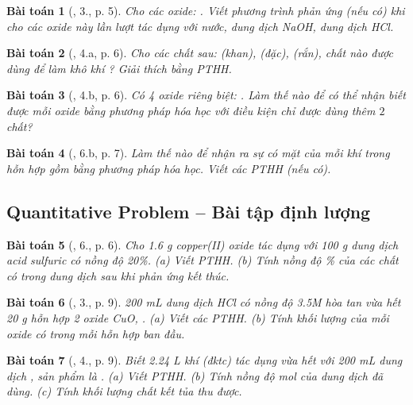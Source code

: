 \documentclass{article}
\newtheorem{baitoan}{Bài toán}
\begin{document}
\begin{baitoan}[\cite{An_350_BT_Hoa_Hoc_9}, 3., p. 5]
	Cho các oxide: \emph{}. Viết phương trình phản ứng (nếu có) khi cho các oxide này lần lượt tác dụng với nước, dung dịch \emph{NaOH}, dung dịch \emph{HCl}.
\end{baitoan}

\begin{baitoan}[\cite{An_350_BT_Hoa_Hoc_9}, 4.a, p. 6]
	Cho các chất sau: \emph{ (khan),  (đặc),  (rắn)}, chất nào được dùng để làm khô khí \emph{}? Giải thích bằng PTHH.
\end{baitoan}

\begin{baitoan}[\cite{An_350_BT_Hoa_Hoc_9}, 4.b, p. 6]
	Có 4 oxide riêng biệt: \emph{}. Làm thế nào để có thể nhận biết được mỗi oxide bằng phương pháp hóa học với điều kiện chỉ được dùng thêm $2$ chất?
\end{baitoan}

\begin{baitoan}[\cite{An_350_BT_Hoa_Hoc_9}, 6.b, p. 7]
	Làm thế nào để nhận ra sự có mặt của mỗi khí trong hỗn hợp gồm \emph{} bằng phương pháp hóa học. Viết các PTHH (nếu có).
\end{baitoan}

\subsection{Quantitative Problem -- Bài tập định lượng}

\begin{baitoan}[\cite{SGK_Hoa_Hoc_9}, 6., p. 6]
	Cho \emph{1.6 g} copper(II) oxide tác dụng với \emph{100 g} dung dịch acid sulfuric có nồng độ \emph{20\%}. (a) Viết PTHH. (b) Tính nồng độ \% của các chất có trong dung dịch sau khi phản ứng kết thúc.
\end{baitoan}

\begin{baitoan}[\cite{SGK_Hoa_Hoc_9}, 3., p. 9]
	\emph{200 mL} dung dịch \emph{HCl} có nồng độ \emph{3.5M} hòa tan vừa hết \emph{20 g} hỗn hợp 2 oxide \emph{CuO, }. (a) Viết các PTHH. (b) Tính khối lượng của mỗi oxide có trong mỗi hỗn hợp ban đầu.
\end{baitoan}

\begin{baitoan}[\cite{SGK_Hoa_Hoc_9}, 4., p. 9]
	Biết \emph{2.24 L} khí \emph{} (đktc) tác dụng vừa hết với \emph{200 mL} dung dịch \emph{}, sản phẩm là \emph{}. (a) Viết PTHH. (b) Tính nồng độ mol của dung dịch \emph{} đã dùng. (c) Tính khối lượng chất kết tủa thu được.
\end{baitoan}
\end{document}
